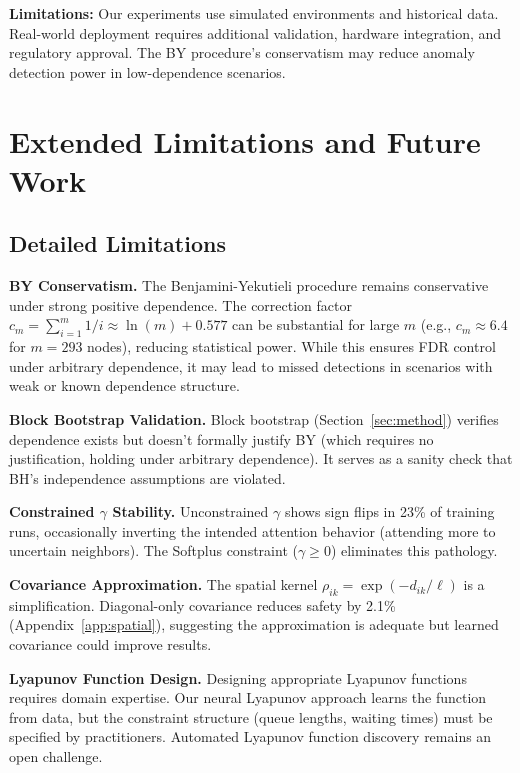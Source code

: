 \documentclass{article}
\theoremstyle{plain}
\theoremstyle{definition}
\theoremstyle{remark}
\begin{document}
\textbf{Limitations:} Our experiments use simulated environments and historical data. Real-world deployment requires additional validation, hardware integration, and regulatory approval. The BY procedure's conservatism may reduce anomaly detection power in low-dependence scenarios.

\section{Extended Limitations and Future Work}
\label{app:limitations}

\subsection{Detailed Limitations}

\textbf{BY Conservatism.} The Benjamini-Yekutieli procedure remains conservative under strong positive dependence. The correction factor $c_m = \sum_{i=1}^m 1/i \approx \ln(m) + 0.577$ can be substantial for large $m$ (e.g., $c_m \approx 6.4$ for $m=293$ nodes), reducing statistical power. While this ensures FDR control under arbitrary dependence, it may lead to missed detections in scenarios with weak or known dependence structure.

\textbf{Block Bootstrap Validation.} Block bootstrap (Section~\ref{sec:method}) verifies dependence exists but doesn't formally justify BY (which requires no justification, holding under arbitrary dependence). It serves as a sanity check that BH's independence assumptions are violated.

\textbf{Constrained $\gamma$ Stability.} Unconstrained $\gamma$ shows sign flips in 23\% of training runs, occasionally inverting the intended attention behavior (attending more to uncertain neighbors). The Softplus constraint ($\gamma \geq 0$) eliminates this pathology.

\textbf{Covariance Approximation.} The spatial kernel $\rho_{ik} = \exp(-d_{ik}/\ell)$ is a simplification. Diagonal-only covariance reduces safety by 2.1\% (Appendix~\ref{app:spatial}), suggesting the approximation is adequate but learned covariance could improve results.

\textbf{Lyapunov Function Design.} Designing appropriate Lyapunov functions requires domain expertise. Our neural Lyapunov approach learns the function from data, but the constraint structure (queue lengths, waiting times) must be specified by practitioners. Automated Lyapunov function discovery remains an open challenge.
\end{document}
